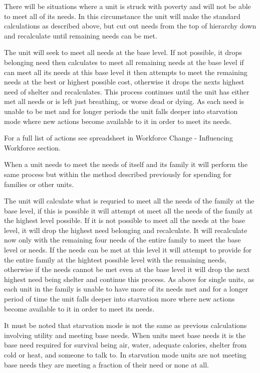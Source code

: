 

There will be situations where a unit is struck with poverty and will not be able to meet all of its needs. In this circumstance the unit will make the standard calculations as described above, but cut out needs from the top of hierarchy down and recalculate until remaining needs can be met. 

The unit will seek to meet all needs at the base level. If not possible, it drops belonging need then calculates to meet all remaining needs at the base level if can meet all its needs at this base level it then attempts to meet the remaining needs at the best or highest possible cost, otherwise it drops the nexts highest need of shelter and recalculates. This process continues until the unit has either met all needs or is left just breathing, or worse dead or dying. As each need is unable to be met and for longer periods the unit falls deeper into starvation mode where new actions become available to it in order to meet its needs.

For a full list of actions see spreadsheet in Workforce Change - Influencing Workforce section.

When a unit needs to meet the needs of itself and its family it will perform the same process but within the method described previously for spending for families or other units. 

The unit will calculate what is requried to meet all the needs of the family at the base level, if this is possible it will attempt ot meet all the needs of the family at the highest level possible. If it is not possible to meet all the needs at the base level, it will drop the highest need belonging and recalculate. It will recalculate now only with the remaining four needs of the entire family to meet the base level or needs. If the needs can be met at this level it will attempt to provide for the entire family at the hightest possible level with the remaining needs, otherwise if the needs cannot be met even at the base level it will drop the next highest need being shelter and continue this process. As above for single units, as each unit in the family is unable to have more of its needs met and for a longer period of time the unit falls deeper into starvation more where new actions become available to it in order to meet its needs.


It must be noted that starvation mode is not the same as previous calculations involving utility and meeting base needs. When units meet base needs it is the base need required for survival being air, water, adequate calories, shelter from cold or heat, and someone to talk to. In starvation mode units are not meeting base needs they are meeting a fraction of their need or none at all.

